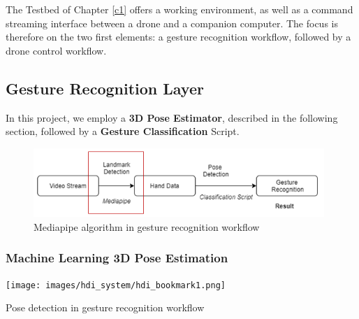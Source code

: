 The Testbed of Chapter \ref{c1} offers a working environment, as well as a command streaming interface between a drone and a companion computer. The focus is therefore on the two first elements: a gesture recognition workflow, followed by a drone control workflow. 

\subsection{Gesture Recognition Layer}


In this project, we employ a \textbf{3D Pose Estimator}, described in the following section, followed by a \textbf{Gesture Classification} Script.

\begin{figure}[h]
  \raggedright
  \includegraphics[width=11cm]{images/hca.png}
  \caption{Mediapipe algorithm in gesture recognition workflow}
  \label{fig:handpipeline_mediapipe}
\end{figure}

\subsubsection{Machine Learning 3D Pose Estimation}

\begin{marginfigure}%
  \vspace{2cm}
  \hspace{1cm}\texttt{[image: images/hdi\_system/hdi\_bookmark1.png]}
  \caption{Pose detection in gesture recognition workflow}
\end{marginfigure}


